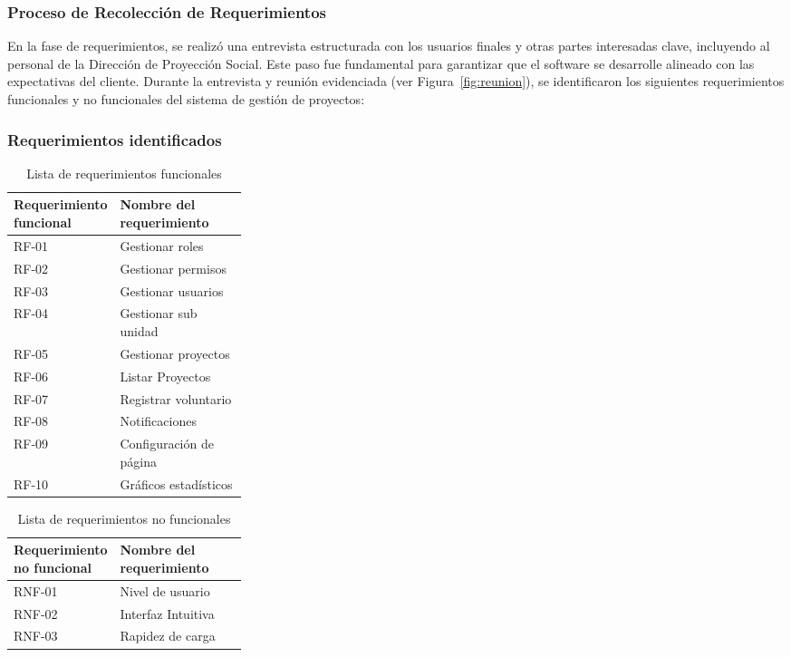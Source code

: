 \FloatBarrier

\subsubsection{Proceso de Recolección de Requerimientos}
En la fase de requerimientos, se realizó una entrevista estructurada con los usuarios finales y otras partes interesadas clave, incluyendo al personal de la Dirección de Proyección Social. Este paso fue fundamental para garantizar que el software se desarrolle alineado con las 
expectativas del cliente. 
Durante la entrevista y reunión evidenciada (ver Figura~\ref{fig:reunion}), se identificaron los siguientes requerimientos funcionales y no funcionales del sistema de gestión de proyectos:


\subsubsection{Requerimientos identificados}
\begin{table}[!htb]
    \centering  
        \caption{Lista de requerimientos funcionales}
    \begin{tabularx}{\linewidth}{
        >{\raggedright\arraybackslash}p{0.30\linewidth} Y
    }
        \toprule
        \textbf{Requerimiento funcional}  &   \textbf{Nombre del requerimiento}   \\
        \midrule
        RF-01   &   Gestionar roles \\
        RF-02   &   Gestionar permisos  \\
        RF-03   &   Gestionar usuarios  \\
        RF-04   &   Gestionar sub unidad    \\
        RF-05   &   Gestionar proyectos \\
        RF-06   &   Listar Proyectos    \\
        RF-07   &   Registrar voluntario    \\
        RF-08   &   Notificaciones  \\
        RF-09   &   Configuración de página \\
        RF-10   &   Gráficos estadísticos   \\
        \bottomrule
    \end{tabularx}
\end{table}
\FloatBarrier

\begin{table}[!htb]
    \centering  
        \caption{Lista de requerimientos no funcionales}
    \begin{tabularx}{\linewidth}{
        >{\raggedright\arraybackslash}p{0.30\linewidth} Y
    }
        \toprule
        \textbf{Requerimiento no funcional}  &   \textbf{Nombre del requerimiento}   \\
        \midrule
        RNF-01   &   Nivel de usuario \\
        RNF-02   &   Interfaz Intuitiva  \\
        RNF-03   &   Rapidez de carga  \\
        \bottomrule
    \end{tabularx}
\end{table}
\FloatBarrier

